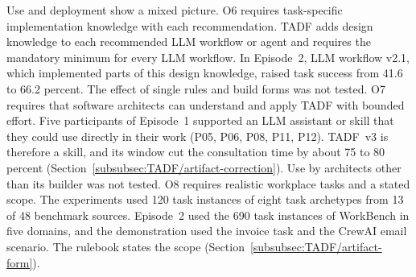 Use and deployment show a mixed picture. O6 requires task-specific implementation knowledge with each recommendation. TADF adds design knowledge to each recommended LLM workflow or agent and requires the mandatory minimum for every LLM workflow. In Episode~2, LLM workflow v2.1, which implemented parts of this design knowledge, raised task success from 41.6 to 66.2 percent. The effect of single rules and build forms was not tested. O7 requires that software architects can understand and apply TADF with bounded effort. Five participants of Episode~1 supported an LLM assistant or skill that they could use directly in their work (P05, P06, P08, P11, P12). TADF~v3 is therefore a skill, and its window cut the consultation time by about 75 to 80 percent (Section~\ref{subsubsec:TADF/artifact-correction}). Use by architects other than its builder was not tested. O8 requires realistic workplace tasks and a stated scope. The experiments used 120 task instances of eight task archetypes from 13 of 48 benchmark sources. Episode~2 used the 690 task instances of WorkBench in five domains, and the demonstration used the invoice task and the CrewAI email scenario. The rulebook states the scope (Section~\ref{subsubsec:TADF/artifact-form}).

\FloatBarrier
